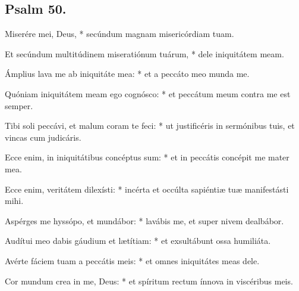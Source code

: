 









\subsection{Psalm 50.}

Miserére mei, Deus, * secúndum magnam misericórdiam tuam.

Et secúndum multitúdinem miseratiónum tuárum, * dele iniquitátem meam.

Ámplius lava me ab iniquitáte mea: * et a peccáto meo munda me.

Quóniam iniquitátem meam ego cognósco: * et peccátum meum contra me est semper.

Tibi soli peccávi, et malum coram te feci: * ut justificéris in sermónibus tuis, et vincas cum judicáris.

Ecce enim, in iniquitátibus concéptus sum: * et in peccátis concépit me mater mea.

Ecce enim, veritátem dilexísti: * incérta et occúlta sapiéntiæ tuæ manifestásti mihi.

Aspérges me hyssópo, et mundábor: * lavábis me, et super nivem dealbábor.

Audítui meo dabis gáudium et lætítiam: * et exsultábunt ossa humiliáta.

Avérte fáciem tuam a peccátis meis: * et omnes iniquitátes meas dele.

Cor mundum crea in me, Deus: * et spíritum rectum ínnova in viscéribus meis.

